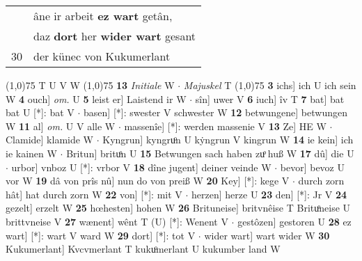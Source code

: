 \documentclass[8pt,a4paper,notitlepage]{article}
\begin{document}
\begin{table}[ht]
\begin{minipage}[t]{0.5\linewidth}
\begin{tabular}{rl}
 & âne ir arbeit \textbf{ez wart} getân,\\ 
 & daz \textbf{dort} her \textbf{wider wart} gesant\\ 
30 & der künec von Kukumerlant\\ 
\end{tabular}
\scriptsize
\line(1,0){75} \newline
T U V W \newline
\line(1,0){75} \newline
\textbf{13} \textit{Initiale} W   $\cdot$ \textit{Majuskel} T  \newline
\line(1,0){75} \newline
\textbf{3} ichs] ich U ich sein W \textbf{4} ouch] \textit{om.} U \textbf{5} leist er] Laistend ir W  $\cdot$ sîn] uwer V \textbf{6} iuch] îv T \textbf{7} bat] bat bat U [*]: bat V  $\cdot$ basen] [*]: swester V schwester W \textbf{12} betwungene] betwungen W \textbf{11} al] \textit{om.} U V alle W  $\cdot$ massenîe] [*]: werden massenie V \textbf{13} Ze] HE W  $\cdot$ Clamide] klamide W  $\cdot$ Kyngrun] kyngruͦn U kẏngrun V kingrun W \textbf{14} ie kein] ich ie kainen W  $\cdot$ Britun] brituͦn U \textbf{15} Betwungen sach haben zuͦ huß W \textbf{17} dû] die U  $\cdot$ urbor] vnboz U [*]: vrbor V \textbf{18} dîne jugent] deiner veinde W  $\cdot$ bevor] bevoz U vor W \textbf{19} dâ von prîs nû] nun do von preiß W \textbf{20} Key] [*]: kege V  $\cdot$ durch zorn hât] hat durch zorn W \textbf{22} von] [*]: mit V  $\cdot$ herzen] herze U \textbf{23} den] [*]: Jr V \textbf{24} gezelt] erzelt W \textbf{25} hœhesten] hohen W \textbf{26} Brituneise] britvnêise T Brituͦneise U brittvneise V \textbf{27} wænent] wênt T (U) [*]: Wenent  V  $\cdot$ gestôzen] gestoren U \textbf{28} ez wart] [*]: wart V ward W \textbf{29} dort] [*]: tot V  $\cdot$ wider wart] wart wider W \textbf{30} Kukumerlant] Kvcvmerlant T kukuͦmerlant U kukumber land W \newline
\end{minipage}
\end{table}
\end{document}
